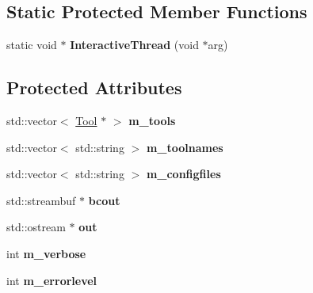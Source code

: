 \subsection*{Static Protected Member Functions}
\begin{DoxyCompactItemize}
\item 
\hypertarget{classToolChain_a7f6fcdce202336463b71aa5167758bd2}{static void $\ast$ {\bfseries Interactive\-Thread} (void $\ast$arg)}\label{classToolChain_a7f6fcdce202336463b71aa5167758bd2}

\end{DoxyCompactItemize}
\subsection*{Protected Attributes}
\begin{DoxyCompactItemize}
\item 
\hypertarget{classToolChain_a5327190043dfcdc67affc35ddb836c68}{std\-::vector$<$ \hyperlink{classTool}{Tool} $\ast$ $>$ {\bfseries m\-\_\-tools}}\label{classToolChain_a5327190043dfcdc67affc35ddb836c68}

\item 
\hypertarget{classToolChain_ab88ccb68da6feb135c032f1356a4889f}{std\-::vector$<$ std\-::string $>$ {\bfseries m\-\_\-toolnames}}\label{classToolChain_ab88ccb68da6feb135c032f1356a4889f}

\item 
\hypertarget{classToolChain_a74cb5832ff5a41714a4da2448b87cee6}{std\-::vector$<$ std\-::string $>$ {\bfseries m\-\_\-configfiles}}\label{classToolChain_a74cb5832ff5a41714a4da2448b87cee6}

\item 
\hypertarget{classToolChain_afd495ff385339222139bd08a8f639f70}{std\-::streambuf $\ast$ {\bfseries bcout}}\label{classToolChain_afd495ff385339222139bd08a8f639f70}

\item 
\hypertarget{classToolChain_acf212e76acd47432881da21765029bee}{std\-::ostream $\ast$ {\bfseries out}}\label{classToolChain_acf212e76acd47432881da21765029bee}

\item 
\hypertarget{classToolChain_a3e157c7148cbdb9eccd43fce185297f5}{int {\bfseries m\-\_\-verbose}}\label{classToolChain_a3e157c7148cbdb9eccd43fce185297f5}

\item 
\hypertarget{classToolChain_a26843fabb52f0fba5f91be3da7564e4e}{int {\bfseries m\-\_\-errorlevel}}\label{classToolChain_a26843fabb52f0fba5f91be3da7564e4e}


\end{DoxyCompactItemize}
